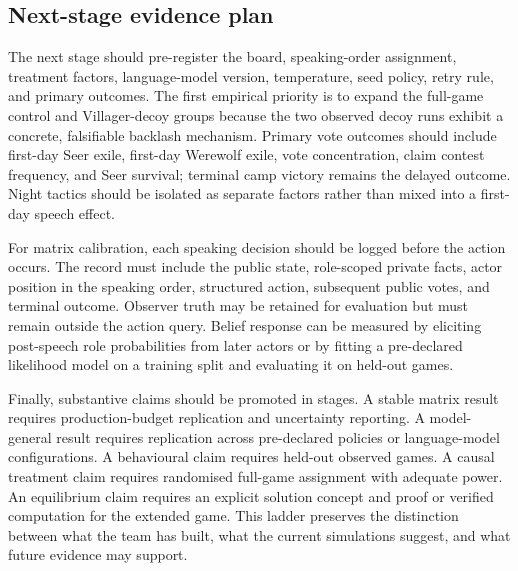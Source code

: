 \documentclass[11pt,a4paper]{article}
\begin{document}
\subsection{Next-stage evidence plan}

The next stage should pre-register the board, speaking-order assignment, treatment factors, language-model version, temperature, seed policy, retry rule, and primary outcomes. The first empirical priority is to expand the full-game control and Villager-decoy groups because the two observed decoy runs exhibit a concrete, falsifiable backlash mechanism. Primary vote outcomes should include first-day Seer exile, first-day Werewolf exile, vote concentration, claim contest frequency, and Seer survival; terminal camp victory remains the delayed outcome. Night tactics should be isolated as separate factors rather than mixed into a first-day speech effect.

For matrix calibration, each speaking decision should be logged before the action occurs. The record must include the public state, role-scoped private facts, actor position in the speaking order, structured action, subsequent public votes, and terminal outcome. Observer truth may be retained for evaluation but must remain outside the action query. Belief response can be measured by eliciting post-speech role probabilities from later actors or by fitting a pre-declared likelihood model on a training split and evaluating it on held-out games.

Finally, substantive claims should be promoted in stages. A stable matrix result requires production-budget replication and uncertainty reporting. A model-general result requires replication across pre-declared policies or language-model configurations. A behavioural claim requires held-out observed games. A causal treatment claim requires randomised full-game assignment with adequate power. An equilibrium claim requires an explicit solution concept and proof or verified computation for the extended game. This ladder preserves the distinction between what the team has built, what the current simulations suggest, and what future evidence may support.
\end{document}

